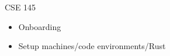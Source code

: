 




\begin{frame}{CSE 145}
    \begin{itemize}
        \item Onboarding
        \item Setup machines/code environments/Rust
    \end{itemize}    
\end{frame}

